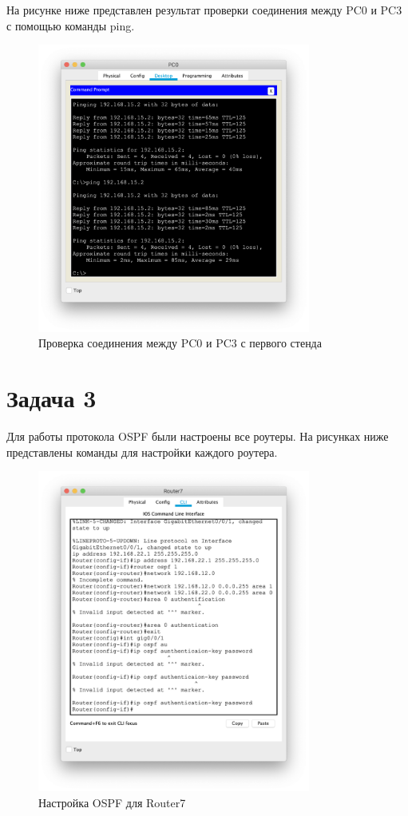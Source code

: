 На рисунке ниже представлен результат проверки соединения между PC0 и PC3 с помощью команды ping.

\begin{figure}[H]
    \centering
    \includegraphics[width=0.8\textwidth]{images/ping_1.png}
    \caption{Проверка соединения между PC0 и PC3 с первого стенда}
    \label{fig:ping_1}
\end{figure}

\section{Задача 3}%
\label{sec:3}

Для работы протокола OSPF были настроены все роутеры. На рисунках ниже представлены команды для настройки каждого роутера.

\begin{figure}[H]
    \centering
    \includegraphics[width=0.8\textwidth]{images/pozor.png}
    \caption{Настройка OSPF для Router7}
    \label{fig:router7}
\end{figure}

